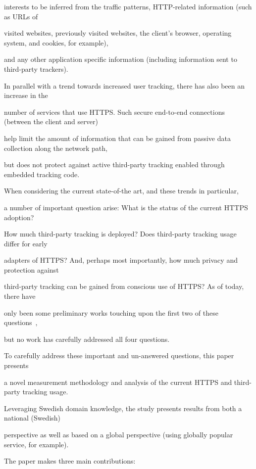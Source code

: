 \documentclass{sig-alternate-10pt}
\begin{document}
interests to be inferred from the traffic patterns, HTTP-related information (such as URLs of 

visited websites, previously visited websites, the client's browser, operating system, and cookies, for example), 

and any other application specific information (including information sent to third-party trackers).



In parallel with a trend towards increased user tracking, there has also been an increase in the 

number of services that use HTTPS.  Such secure end-to-end connections (between the client and server) 

help limit the amount of information that can be gained from passive data collection along the network path, 

but does not protect against active third-party tracking enabled through embedded tracking code.  

When considering the current state-of-the art, and these trends in particular, 

a number of important question arise:  What is the status of the current HTTPS adoption?  

How much third-party tracking is deployed?  Does third-party tracking usage differ for early 

adapters of HTTPS? And, perhaps most importantly, how much privacy and protection against 

third-party tracking can be gained from conscious use of HTTPS?  As of today, there have 

only been some preliminary works touching upon the first two of these questions~\cite{BuMS11,NFL+14}, 

but no work has carefully addressed all four questions.



To carefully address these important and un-answered questions, this paper presents 

a novel measurement methodology and analysis of the current HTTPS and third-party tracking usage.  

Leveraging Swedish domain knowledge, the study presents results from both a national (Swedish) 

perspective as well as based on a global perspective (using globally popular service, for example).  

The paper makes three main contributions:
\end{document}
